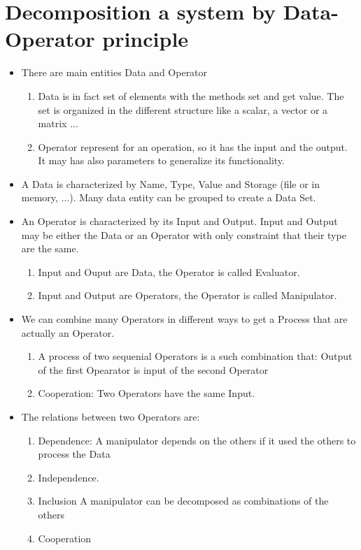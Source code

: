 \documentclass{report}
\begin{document}
\section{Decomposition a system by Data-Operator principle}
\begin{itemize}
\item There are main entities Data and Operator
  \begin{enumerate}
  \item Data is in fact set of elements with the methods set and get value. The
    set is organized in the different structure like a scalar, a vector or a matrix ...
  \item Operator represent for an operation, so it has  the input and the output.
    It may has also parameters to generalize its functionality.
  \end{enumerate}
\item A Data is characterized by Name, Type, Value and Storage (file or in memory, ...). Many data entity
  can be grouped to create a Data Set.
\item An Operator is characterized by its Input and Output. Input and Output may be either the Data or an Operator with
  only constraint that their type are the same.
  \begin{enumerate}
  \item Input and Ouput are Data, the Operator is called Evaluator.
  \item Input and Output are Operators, the Operator is called Manipulator.
  \end{enumerate}
\item We can combine many Operators in different ways to get a Process that are actually
  an Operator.
  \begin{enumerate}
  \item A process of two sequenial Operators is a such combination that: Output of the first Opearator is input
    of the second Operator
  \item Cooperation: Two Operators have the same Input.
  \end{enumerate}
\item The relations between two Operators are:
  \begin{enumerate}
  \item Dependence: A manipulator depends on the others if it used the others to process
    the Data
  \item Independence.
  \item Inclusion A manipulator can be decomposed as combinations of the others
  \item Cooperation
  \end{enumerate}
\end{itemize}
\end{document}
